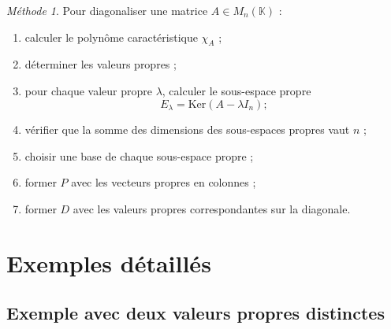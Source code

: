 \documentclass[11pt,a4paper]{article}
\theoremstyle{remark}
\newtheorem*{methode}{Méthode}
\newcommand{\K}{\mathbb{K}}
\newcommand{\Ker}{\mathrm{Ker}}
\begin{document}
\begin{methode}
Pour diagonaliser une matrice \(A\in M_n(\K)\) :
\begin{enumerate}[label=\arabic*)]
    \item calculer le polynôme caractéristique \(\chi_A\) ;
    \item déterminer les valeurs propres ;
    \item pour chaque valeur propre \(\lambda\), calculer le sous-espace propre
    \[
    E_\lambda=\Ker(A-\lambda I_n) ;
    \]
    \item vérifier que la somme des dimensions des sous-espaces propres vaut \(n\) ;
    \item choisir une base de chaque sous-espace propre ;
    \item former \(P\) avec les vecteurs propres en colonnes ;
    \item former \(D\) avec les valeurs propres correspondantes sur la diagonale.
\end{enumerate}
\end{methode}

\section{Exemples détaillés}

\subsection{Exemple avec deux valeurs propres distinctes}
\end{document}
